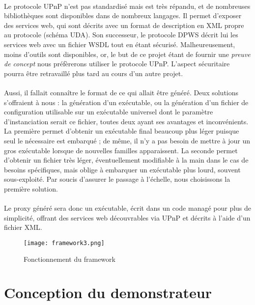 \documentclass[nocopyrightspace]{sigplanconf}
\begin{document}
		\paragraph{}
		Le protocole UPnP\cite{upnpcourse} n'est pas standardisé mais est très répandu, et de nombreuses bibliothèques sont disponibles dans de nombreux langages. Il permet d'exposer des services web, qui sont décrits avec un format de description en XML propre au protocole (schéma UDA). Son successeur, le protocole DPWS décrit lui les services web avec un fichier WSDL tout en étant sécurisé. Malheureusement, moins d'outils sont disponibles, or, le but de ce projet étant de fournir une \emph{preuve de concept} nous préfèrerons utiliser le protocole UPnP. L’aspect sécuritaire pourra être retravaillé plus tard au cours d’un autre projet.


		\paragraph{}
		Aussi, il fallait connaître le format de ce qui allait être généré. Deux solutions s'offraient à nous : la génération d'un exécutable, ou la génération d'un fichier de configuration utilisable sur un exécutable universel dont le paramètre d’instanciation serait ce fichier, toutes deux ayant ses avantages et inconvénients. La première permet d'obtenir un exécutable final beaucoup plus léger puisque seul le nécessaire est embarqué ; de même, il n'y a pas besoin de mettre à jour un gros exécutable lorsque de nouvelles familles apparaissent. La seconde permet d'obtenir un fichier très léger, éventuellement modifiable à la main dans le cas de besoins spécifiques, mais oblige à embarquer un exécutable plus lourd, souvent sous-exploité. Par soucis d'assurer le passage à l'échelle, nous choisissons la première solution.

		\paragraph{}
		Le proxy généré sera donc un exécutable, écrit dans un code managé pour plus de simplicité, offrant des services web découvrables via UPnP et décrits à l'aide d'un fichier XML.

		\begin{figure}[t]
			\centering
			\texttt{[image: framework3.png]}
			\caption{Fonctionnement du framework}
		\end{figure}


\section{Conception du demonstrateur}
\end{document}
